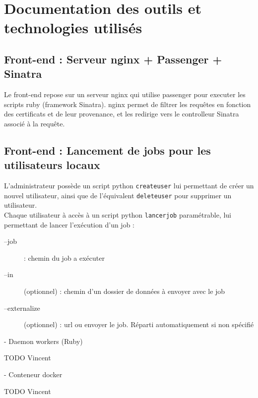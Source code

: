 \newpage

\chapter{Documentation des outils et technologies utilisés}

\section{Front-end : Serveur nginx + Passenger + Sinatra}

Le front-end repose sur un serveur nginx qui utilise passenger pour executer les scripts ruby (framework Sinatra).
nginx permet de filtrer les requêtes en fonction des certificats et de leur provenance, et les redirige vers le controlleur Sinatra associé à la requête.

\section{Front-end : Lancement de jobs pour les utilisateurs locaux} 

L'administrateur possède un script python {\tt createuser} lui permettant de créer un nouvel utilisateur, ainsi que de l'équivalent {\tt deleteuser} pour supprimer un utilisateur. \\

Chaque utilisateur à accès à un script python {\tt lancerjob} paramétrable, lui permettant de lancer l'exécution d'un job :\\
\begin{description}
	\item[--job] : chemin du job a exécuter
	\item[--in] (optionnel) : chemin d'un dossier de données à envoyer avec le job
	\item[--externalize] (optionnel) : url ou envoyer le job. Réparti automatiquement si non spécifié
\end{description}

- Daemon workers (Ruby) 

TODO Vincent

- Conteneur docker

TODO Vincent
